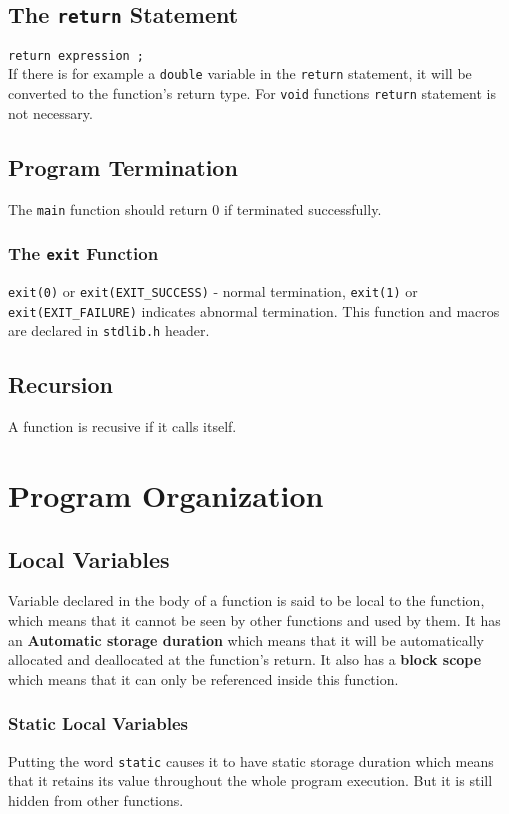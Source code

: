 \documentclass[openany]{book}
\begin{document}
    \section{The \texttt{return} Statement}
    \texttt{return expression ;} \\
    If there is for example a \texttt{double} variable in the \texttt{return} statement, it will be converted to the function's return type. For \texttt{void} functions \texttt{return} statement is not necessary.

    \section{Program Termination}
    The \texttt{main} function should return 0 if terminated successfully.

    \subsection*{The \texttt{exit} Function}
    \texttt{exit(0)} or \texttt{exit(EXIT\_SUCCESS)} - normal termination, \texttt{exit(1)} or \texttt{exit(EXIT\_FAILURE)} indicates abnormal termination. This function and macros are declared in \texttt{stdlib.h} header.

    \section{Recursion}
    A function is recusive if it calls itself.



    \chapter{Program Organization}

    \section{Local Variables}
    Variable declared in the body of a function is said to be local to the function, which means that it cannot be seen by other functions and used by them. It has an \textbf{Automatic storage duration} which means that it will be automatically allocated and deallocated at the function's return. It also has a \textbf{block scope} which means that it can only be referenced inside this function.

    \subsection*{Static Local Variables}
    Putting the word \texttt{static} causes it to have static storage duration which means that it retains its value throughout the whole program execution. But it is still hidden from other functions.
\end{document}
